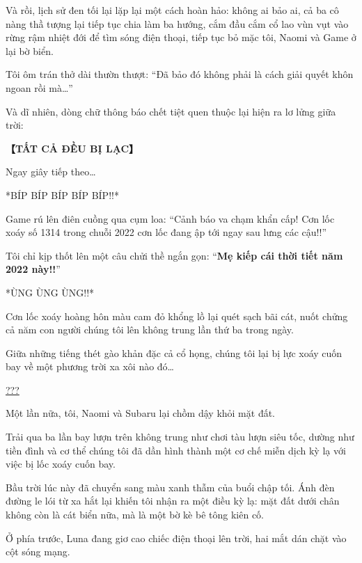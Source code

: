 \documentclass[../main.tex]{subfiles}
\begin{document}
Và rồi, lịch sử đen tối lại lặp lại một cách hoàn hảo: không ai bảo ai, cả ba cô nàng thầ tượng lại tiếp tục chia làm ba hướng, cắm đầu cắm cổ lao vùn vụt vào rừng rậm nhiệt đới để tìm sóng điện thoại, tiếp tục bỏ mặc tôi, Naomi và Game ở lại bờ biển.


Tôi ôm trán thở dài thườn thượt: ``Đã bảo đó không phải là cách giải quyết khôn ngoan rồi mà\dots''

Và dĩ nhiên, dòng chữ thông báo chết tiệt quen thuộc lại hiện ra lơ lửng giữa trời:

\begin{center}
  \textbf{【TẤT CẢ ĐỀU BỊ LẠC】}
\end{center}

Ngay giây tiếp theo\dots

*BÍP BÍP BÍP BÍP BÍP!!*

Game rú lên điên cuồng qua cụm loa: ``Cảnh báo va chạm khẩn cấp! Cơn lốc xoáy số 1314 trong chuỗi 2022 cơn lốc đang ập tới ngay sau lưng các cậu!!''

Tôi chỉ kịp thốt lên một câu chửi thề ngắn gọn: ``\textbf{Mẹ kiếp cái thời tiết năm 2022 này!!}''

*ÙNG ÙNG ÙNG!!*

Cơn lốc xoáy hoàng hôn màu cam đỏ khổng lồ lại quét sạch bãi cát, nuốt chửng cả năm con người chúng tôi lên không trung lần thứ ba trong ngày.

Giữa những tiếng thét gào khản đặc cả cổ họng, chúng tôi lại bị lực xoáy cuốn bay về một phương trời xa xôi nào đó\dots

\ct

\begin{center}
  \uline{???}
\end{center}

Một lần nữa, tôi, Naomi và Subaru lại chồm dậy khỏi mặt đất.

Trải qua ba lần bay lượn trên không trung như chơi tàu lượn siêu tốc, dường như tiền đình và cơ thể chúng tôi đã dần hình thành một cơ chế miễn dịch kỳ lạ với việc bị lốc xoáy cuốn bay.

Bầu trời lúc này đã chuyển sang màu xanh thẫm của buổi chập tối. Ánh đèn đường le lói từ xa hắt lại khiến tôi nhận ra một điều kỳ lạ: mặt đất dưới chân không còn là cát biển nữa, mà là một bờ kè bê tông kiên cố.

Ở phía trước, Luna đang giơ cao chiếc điện thoại lên trời, hai mắt dán chặt vào cột sóng mạng.

\end{document}
